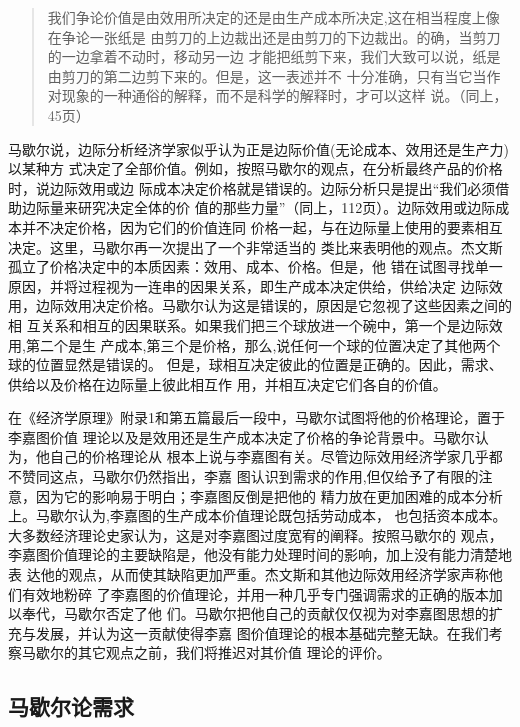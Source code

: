 \begin{quotation}
  我们争论价值是由效用所决定的还是由生产成本所决定,这在相当程度上像在争论一张纸是
  由剪刀的上边裁出还是由剪刀的下边裁出。的确，当剪刀的一边拿着不动时，移动另一边
  才能把纸剪下来，我们大致可以说，纸是由剪刀的第二边剪下来的。但是，这一表述并不
  十分准确，只有当它当作对现象的一种通俗的解释，而不是科学的解释时，才可以这样
  说。（同上，45页）
\end{quotation}

马歇尔说，边际分析经济学家似乎认为正是边际价值(无论成本、效用还是生产力)以某种方
式决定了全部价值。例如，按照马歇尔的观点，在分析最终产品的价格时，说边际效用或边
际成本决定价格就是错误的。边际分析只是提出“我们必须借助边际量来研究决定全体的价
值的那些力量”（同上，112页）。边际效用或边际成本并不决定价格，因为它们的价值连同
价格一起，与在边际量上使用的要素相互决定。这里，马歇尔再一次提出了一个非常适当的
类比来表明他的观点。杰文斯孤立了价格决定中的本质因素：效用、成本、价格。但是，他
错在试图寻找单一原因，并将过程视为一连串的因果关系，即生产成本决定供给，供给决定
边际效用，边际效用决定价格。马歇尔认为这是错误的，原因是它忽视了这些因素之间的相
互关系和相互的因果联系。如果我们把三个球放进一个碗中，第一个是边际效用,第二个是生
产成本,第三个是价格，那么,说任何一个球的位置决定了其他两个球的位置显然是错误的。
但是，球相互决定彼此的位置是正确的。因此，需求、供给以及价格在边际量上彼此相互作
用，并相互决定它们各自的价值。

在《经济学原理》附录1和第五篇最后一段中，马歇尔试图将他的价格理论，置于李嘉图价值
理论以及是效用还是生产成本决定了价格的争论背景中。马歇尔认为，他自己的价格理论从
根本上说与李嘉图有关。尽管边际效用经济学家几乎都不赞同这点，马歇尔仍然指出，李嘉
图认识到需求的作用,但仅给予了有限的注意，因为它的影响易于明白；李嘉图反倒是把他的
精力放在更加困难的成本分析上。马歇尔认为,李嘉图的生产成本价值理论既包括劳动成本，
也包括资本成本。大多数经济理论史家认为，这是对李嘉图过度宽宥的阐释。按照马歇尔的
观点，李嘉图价值理论的主要缺陷是，他没有能力处理时间的影响，加上没有能力清楚地表
达他的观点，从而使其缺陷更加严重。杰文斯和其他边际效用经济学家声称他们有效地粉碎
了李嘉图的价值理论，并用一种几乎专门强调需求的正确的版本加以奉代，马歇尔否定了他
们。马歇尔把他自己的贡献仅仅视为对李嘉图思想的扩充与发展，并认为这一贡献使得李嘉
图价值理论的根本基础完整无缺。在我们考察马歇尔的其它观点之前，我们将推迟对其价值
理论的评价。

\subsection{马歇尔论需求}


